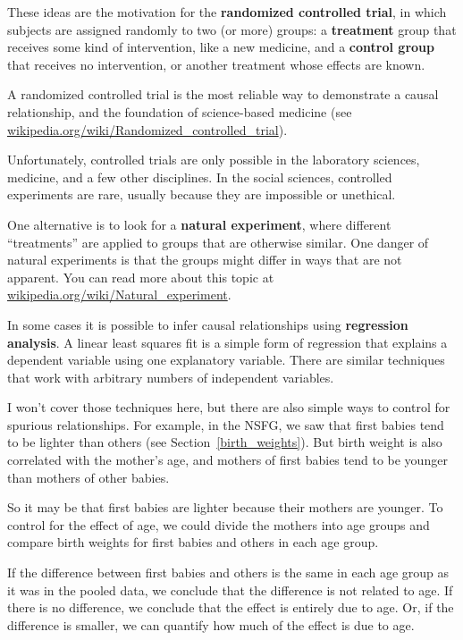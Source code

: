 \documentclass[12pt]{book}
\begin{document}
These ideas are the motivation for the {\bf randomized controlled
trial}, in which subjects are assigned randomly to two (or more)
groups: a {\bf treatment} group that receives some kind of intervention,
like a new medicine, and a {\bf control group} that receives
no intervention, or another treatment whose effects are known.

A randomized controlled trial is the most reliable way to demonstrate
a causal relationship, and the foundation of science-based medicine
(see \url{wikipedia.org/wiki/Randomized_controlled_trial}).

Unfortunately, controlled trials are only possible in the laboratory
sciences, medicine, and a few other disciplines.  In the social sciences,
controlled experiments are rare, usually because they are impossible
or unethical.

One alternative is to look for a {\bf natural experiment}, where
different ``treatments'' are applied to groups that are otherwise
similar.  One danger of natural experiments is that the groups might
differ in ways that are not apparent.  You can read more about this
topic at \url{wikipedia.org/wiki/Natural_experiment}.

In some cases it is possible to infer causal relationships using {\bf
  regression analysis}.  A linear least squares fit
is a simple form of regression that explains a dependent
variable using one explanatory variable.  There are similar
techniques that work with arbitrary numbers of independent variables.

I won't cover those techniques here, but there are also simple ways to
control for spurious relationships.  For example, in the NSFG, we saw
that first babies tend to be lighter than others (see
Section~\ref{birth_weights}).  But birth weight is also correlated
with the mother's age, and mothers of first babies tend to be younger
than mothers of other babies.


So it may be that first babies are lighter because their mothers are
younger.  To control for the effect of age, we could divide the mothers
into age groups and compare birth weights for first babies and others
in each age group.

If the difference between first babies and others is the same in
each age group as it was in the pooled data, we conclude
that the difference is not related to age.  If there is no difference,
we conclude that the effect is entirely due to age.  Or,
if the difference is smaller, we can quantify how much of the effect
is due to age.
\end{document}
